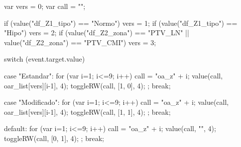 		var vers = 0;
		var call = "";

		if (value("df_Z1_tipo") == "Normo") { vers = 1; }	
		if (value("df_Z1_tipo") == "Hipo") { vers = 2; }	
		if (value("df_Z2_zona") == "PTV_LN" || value("df_Z2_zona") == "PTV_CMI") { vers = 3; }


		switch (event.target.value) {
			case "Estandar":
				for (var i=1; i<=9; i++) {
					call = "oa_z" + i;
					value(call, oar_list[vers][i-1], 4);
					toggleRW(call, [1, 0], 4); 	
				}; break;

			case "Modificado":
				for (var i=1; i<=9; i++) {
					call = "oa_z" + i;
					value(call, oar_list[vers][i-1], 4);
					toggleRW(call, [1, 1], 4); 	
				}; break;

			default:
				for (var i=1; i<=9; i++) {
					call = "oa_z" + i;
					value(call, "", 4);
					toggleRW(call, [0, 1], 4); 	
				}; break;
		}

	\stopJScode

\stopenvironment
